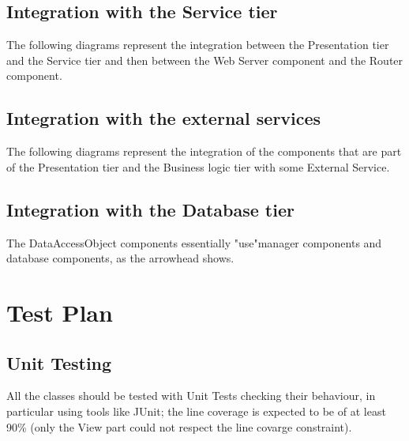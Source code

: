 \documentclass[../DD.tex]{subfiles}
\begin{document}

\subsection{Integration with the Service tier}
The following diagrams represent the integration between the Presentation tier and the Service tier and then between the Web Server component and the Router component.


\subsection{Integration with the external services}
The following diagrams represent the integration of the components that are part of the Presentation tier and the Business logic tier with some External Service.


\subsection{Integration with the Database tier}
The DataAccessObject components essentially "use"manager components and database components, as the arrowhead shows.


\section{Test Plan\label{5.4}}

\subsection{Unit Testing\label{5.4.1}}
All the classes should be tested with Unit Tests checking their behaviour, in particular using tools like JUnit; the line coverage is expected to be of at least 90\% (only the View part could not respect the line covarge constraint).
\end{document}
